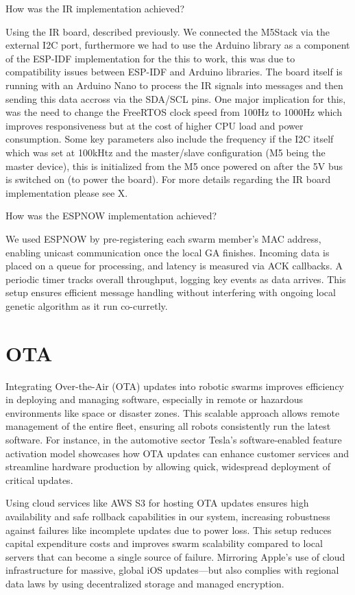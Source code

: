 \documentclass[conference]{IEEEtran}
\begin{document}
How was the IR implementation achieved?

Using the IR board, described previously. We connected the M5Stack via the external I2C port, furthermore we had to use the Arduino library as a component of the ESP-IDF implementation for the this to work, this was due to compatibility issues between ESP-IDF and Arduino libraries. The board itself is running with an Arduino Nano to process the IR signals into messages and then sending this data accross via the SDA/SCL pins. One major implication for this, was the need to change the FreeRTOS clock speed from 100Hz to 1000Hz which improves responsiveness but at the cost of higher CPU load and power consumption. Some key parameters also include the frequency if the I2C itself which was set at 100kHtz and the master/slave configuration (M5 being the master device), this is initialized from the M5 once powered on after the 5V bus is switched on (to power the board). For more details regarding the IR board implementation please see X. 

How was the ESPNOW implementation achieved?

We used ESPNOW by pre-registering each swarm member’s MAC address, enabling unicast communication once the local GA finishes. Incoming data is placed on a queue for processing, and latency is measured via ACK callbacks. A periodic timer tracks overall throughput, logging key events as data arrives. This setup ensures efficient message handling without interfering with ongoing local genetic algorithm as it run co-curretly.


\section{OTA}\label{sec:ota}


Integrating Over-the-Air (OTA) updates into robotic swarms improves efficiency in deploying and managing software, especially in remote or hazardous environments like space or disaster zones. This scalable approach allows remote management of the entire fleet, ensuring all robots consistently run the latest software. For instance, in the automotive sector Tesla's software-enabled feature activation model showcases how OTA updates can enhance customer services and streamline hardware production by allowing quick, widespread deployment of critical updates.

Using cloud services like AWS S3 for hosting OTA updates ensures high availability and safe rollback capabilities in our system, increasing robustness against failures like incomplete updates due to power loss. This setup reduces capital expenditure costs and improves swarm scalability compared to local servers that can become a single source of failure. Mirroring Apple’s use of cloud infrastructure for massive, global iOS updates—but also complies with regional data laws by using decentralized storage and managed encryption.
\end{document}
